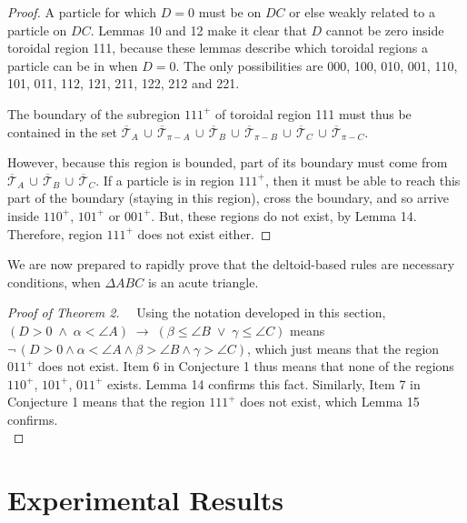 \documentclass[a4paper, twoside]{article}
\begin{document}
\begin{proof}

A particle for which $D = 0$ must be on $DC$ or else weakly related to a particle on $DC$. Lemmas 10 and 12 make it clear that $D$ cannot be zero inside toroidal region 111, because these lemmas describe which toroidal regions a particle can be in when $D = 0$. The only possibilities are 000, 100, 010, 001, 110, 101, 011, 112, 121, 211, 122, 212 and 221. 

The boundary of the subregion $111^+$ of toroidal region 111 must thus be contained in the set $\overline{\mathcal{T}}_A \, \cup \, \overline{\mathcal{T}}_{\pi-A} \, \cup \, \overline{\mathcal{T}}_B \, \cup \, \overline{\mathcal{T}}_{\pi-B} \, \cup \, \overline{\mathcal{T}}_C \, \cup \, \overline{\mathcal{T}}_{\pi-C}$. 

However, because this region is bounded, part of its boundary must come from $\overline{\mathcal{T}}_A \, \cup \, \overline{\mathcal{T}}_B \, \cup \, \overline{\mathcal{T}}_C$. If a particle is in region $111^+$, then it must be able to reach this part of the boundary (staying in this region), cross the boundary, and so arrive inside $110^+$, $101^+$ or $001^+$. But, these regions do not exist, by Lemma 14. Therefore, region $111^+$ does not exist either.   

\end{proof}

\vspace{2mm}

We are now prepared to rapidly prove that the deltoid-based rules are necessary conditions, when $\Delta ABC$ is an acute triangle. 

\begin{proof}[Proof of Theorem 2] 

\ \ Using the notation developed in this section, $( D > 0 \; \wedge \; \alpha < \angle A ) \; \rightarrow \; ( \beta \le \angle B \; \vee \; \gamma \le \angle C )$ means $\neg \, ( D > 0 \wedge \alpha < \angle A \wedge \beta > \angle B \wedge \gamma > \angle C )$, which just means that the region $011^+$ does not exist. Item 6 in Conjecture 1 thus means that none of the regions $110^+$, $101^+$, $011^+$ exists. Lemma 14 confirms this fact. Similarly, Item 7 in Conjecture 1 means that the region $111^+$ does not exist, which Lemma 15 confirms. \\

\end{proof} 


\section{Experimental Results} 
\end{document}
